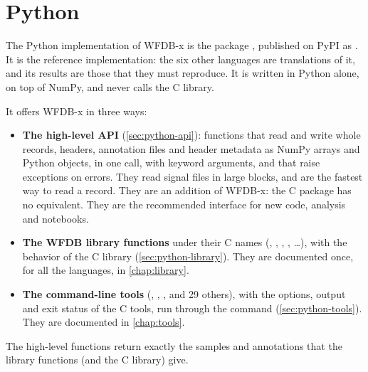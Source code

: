 \chapter{Python}
\label{chap:python}

The Python implementation of WFDB-x is the package , published on PyPI as
. It is the reference implementation: the six other languages are
translations of it, and its results are those that they must reproduce. It is written in
Python alone, on top of NumPy, and never calls the C library.

It offers WFDB-x in three ways:
\begin{itemize}
\item \textbf{The high-level API} (\cref{sec:python-api}): functions that read and write
  whole records, headers, annotation files and header metadata as NumPy arrays and Python
  objects, in one call, with keyword arguments, and that raise exceptions on errors. They
  read signal files in large blocks, and are the fastest way to read a record. They are an
  addition of WFDB-x: the C package has no equivalent. They are the recommended interface
  for new code, analysis and notebooks.
\item \textbf{The WFDB library functions} under their C names (,
  , , , \ldots), with the behavior of the C library
  (\cref{sec:python-library}). They are documented once, for all the languages, in
  \cref{chap:library}.
\item \textbf{The command-line tools} (, , ,
   and 29 others), with the options, output and exit status of the C tools,
  run through the  command (\cref{sec:python-tools}). They are documented in
  \cref{chap:tools}.
\end{itemize}
The high-level functions return exactly the samples and annotations that the library
functions (and the C library) give.

